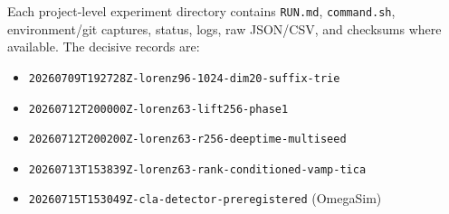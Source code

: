 \documentclass[11pt]{article}
\begin{document}
Each project-level experiment directory contains \texttt{RUN.md},
\texttt{command.sh}, environment/git captures, status, logs, raw JSON/CSV, and
checksums where available. The decisive records are:
\begin{itemize}
\item \texttt{20260709T192728Z-lorenz96-1024-dim20-suffix-trie}
\item \texttt{20260712T200000Z-lorenz63-lift256-phase1}
\item \texttt{20260712T200200Z-lorenz63-r256-deeptime-multiseed}
\item \texttt{20260713T153839Z-lorenz63-rank-conditioned-vamp-tica}
\item \texttt{20260715T153049Z-cla-detector-preregistered} (OmegaSim)
\end{itemize}
\end{document}
